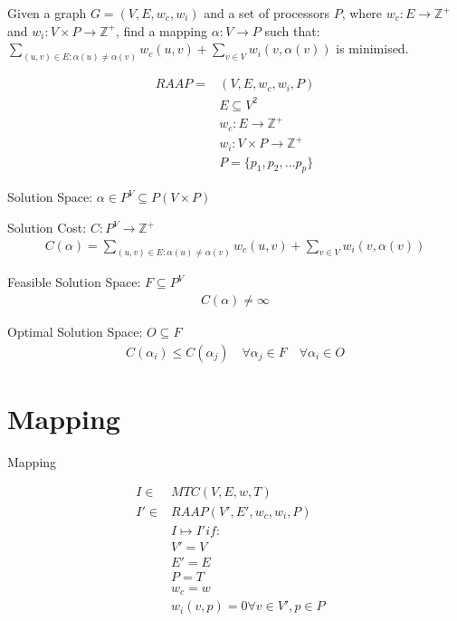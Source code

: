 \documentclass{article}
\begin{document}
\begin{definition}
Given a graph $G=(V,E,w_c,w_i)$ and a set of processors $P$, where $w_c : E \rightarrow \mathbb{Z}^+$ and $w_i : V \times P \rightarrow \mathbb{Z}^+$, find a mapping $\alpha : V \rightarrow P$ such that:
$\displaystyle\sum\limits_{(u,v) \in E : \alpha(u) \neq \alpha(v)} w_c(u,v) + \displaystyle\sum\limits_{v \in V} w_i(v, \alpha(v))$ is minimised.

\begin{align}
	\nonumber RAAP = & (V,E,w_c, w_i, P)\\
	\nonumber & E \subseteq V^2\\
	\nonumber & w_c : E \rightarrow \mathbb{Z}^+\\
	\nonumber & w_i : V \times P \rightarrow \mathbb{Z}^+\\
	\nonumber & P = \{p_1, p_2, ...p_p\}
\end{align}

Solution Space: $\alpha \in P^V \subseteq P(V \times P)$

Solution Cost: $C : P^V \rightarrow \mathbb{Z}^+$
\begin{align}
	\nonumber C(\alpha) = \displaystyle\sum\limits_{(u,v) \in E : \alpha(u) \neq \alpha(v)} w_c(u,v) + \displaystyle\sum\limits_{v \in V} w_i(v, \alpha(v))
\end{align}

Feasible Solution Space: $F \subseteq P^V$
\begin{align}
	\nonumber C(\alpha) \neq \infty
\end{align}

Optimal Solution Space: $O \subseteq F$
\begin{align}
	\nonumber 	C(\alpha_i) \leq C(\alpha_j) \quad \forall \alpha_j \in F \quad \forall \alpha_i \in O
\end{align}

\end{definition}

\section{Mapping}

\begin{definition}
Mapping

\begin{align}
	\nonumber I \in & MTC(V,E,w,T) &\\
	\nonumber I' \in & RAAP(V', E', w_c, w_i, P) &\\
	\nonumber & I \mapsto I' if: &\\
	\nonumber & V' = V\\
	\nonumber & E' = E\\
	\nonumber & P = T\\
	\nonumber & w_c = w\\
	\nonumber & w_i(v,p) = 0 \forall v \in V', p \in P
\end{align}
\end{definition}
\end{document}
